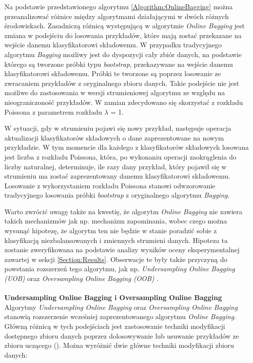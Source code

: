 \noindent Na podstawie przedstawionego algorytmu \ref{Algorithm:OnlineBagging} można przeanalizować różnice między algorytmami działającymi w dwóch różnych środowiskach. Zasadniczą różnicą występującą w algorytmie \textit{Online Bagging} jest zmiana w podejściu do losowania przykładów, które mają zostać przekazane na wejście danemu klasyfikatorowi składowemu. W przypadku tradycyjnego algorytmu \textit{Bagging} możliwy jest do dyspozycji cały zbiór danych, na podstawie którego są tworzone próbki typu \textit{bootstrap}, przekazywane na wejście danemu klasyfikatorowi składowemu. Próbki te tworzone są poprzez losowanie ze zwracaniem przykładów z oryginalnego zbioru danych. Takie podejście nie jest możliwe do zastosowania w wersji strumieniowej algorytmu ze względu na nieograniczoność przykładów. W zamian zdecydowano się skorzystać z rozkładu Poissona z parametrem rozkładu $\lambda$ = 1. 

W sytuacji, gdy w strumieniu pojawi się nowy przykład, następuje operacja aktualizacji klasyfikatorów składowych o dane zaprezentowane na nowym przykładzie. W tym momencie dla każdego z klasyfikatorów składowych losowana jest liczba z rozkładu Poissona, która, po wykonaniu operacji zaokrąglenia do liczby naturalnej, determinuje, ile razy dany przykład, który pojawił się w strumieniu ma zostać zaprezentowany danemu klasyfikatorowi składowemu. Losowanie z wykorzystaniem rozkładu Poissona stanowi odwzorowanie tradycyjnego losowania próbki \textit{bootstrap} z oryginalnego algorytmu \textit{Bagging}.

Warto zwrócić uwagę także na kwestię, że algorytm \textit{Online Bagging} nie zawiera takich mechanizmów jak np. mechanizm zapominania, wobec czego można wysunąć hipotezę, że algorytm ten nie będzie w stanie poradzić sobie z klasyfikacją niezbalansowanych i zmiennych strumieni danych. Hipoteza ta zostanie zweryfikowana na podstawie analizy wyników oceny eksperymentalnej zawartej w sekcji \ref{Section:Results}. Obserwacje te były także przyczyną do powstania rozszerzeń tego algorytmu, jak np. \textit{Undersampling Online Bagging (UOB)} oraz \textit{Oversampling Online Bagging (OOB)} \cite{Article:OBFirst}\cite{Article:OBSecond}.\\\\
\textbf{Undersampling Online Bagging i Oversampling Online Bagging}\\

\noindent Algorytmy \textit{Undersampling Online Bagging} oraz \textit{Oversampling Online Bagging} stanowią rozszerzenie wcześniej zaprezentowanego algorytmu \textit{Online Bagging}. Główną różnicą w tych podejściach jest zastosowanie techniki modyfikacji dostępnego zbioru danych poprzez dolosowywanie lub usuwanie przykładów ze zbioru uczącego (). Można wyróżnić dwie główne techniki modyfikacji zbioru danych:

